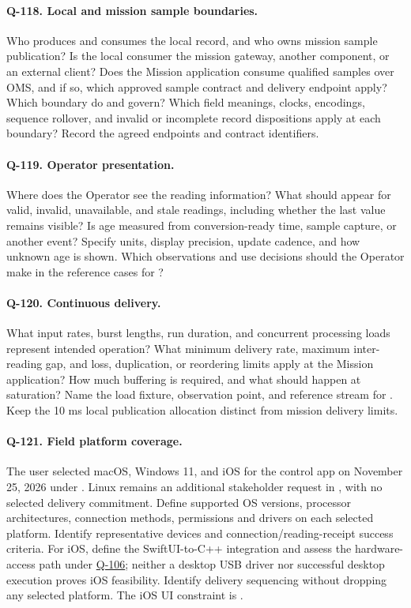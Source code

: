 \paragraph{Q-118. Local and mission sample boundaries.}\label{Question:Q-118}
Who produces and consumes the local record, and who owns mission sample
publication? Is the local consumer the mission gateway, another component,
or an external client? Does the Mission application consume qualified samples
over OMS, and if so, which approved sample contract and delivery endpoint
apply? Which boundary do  and
 govern? Which field meanings, clocks, encodings,
sequence rollover, and invalid or incomplete record dispositions apply at
each boundary? Record the agreed endpoints and contract identifiers.

\paragraph{Q-119. Operator presentation.}\label{Question:Q-119}
Where does the Operator see the reading information? What should appear for
valid, invalid, unavailable, and stale readings, including whether the last
value remains visible? Is age measured from conversion-ready time, sample
capture, or another event? Specify units, display precision, update cadence,
and how unknown age is shown. Which observations and use decisions should
the Operator make in the reference cases for ?

\paragraph{Q-120. Continuous delivery.}\label{Question:Q-120}
What input rates, burst lengths, run duration, and concurrent processing
loads represent intended operation? What minimum delivery rate, maximum
inter-reading gap, and loss, duplication, or reordering limits apply at the
Mission application? How much buffering is required, and what should
happen at saturation? Name the load fixture, observation point, and
reference stream for . Keep the 10 ms local
publication allocation distinct from mission delivery limits.

\paragraph{Q-121. Field platform coverage.}\label{Question:Q-121}
The user selected macOS, Windows 11, and iOS for the control app on November 25, 2026 under . Linux remains an additional stakeholder request in , with no selected delivery commitment. Define supported OS versions, processor architectures, connection methods, permissions and drivers on each selected platform. Identify representative devices and connection/reading-receipt success criteria. For iOS, define the SwiftUI-to-C++ integration and assess the hardware-access path under \hyperref[Question:Q-106]{Q-106}; neither a desktop USB driver nor successful desktop execution proves iOS feasibility. Identify delivery sequencing without dropping any selected platform. The iOS UI constraint is .

